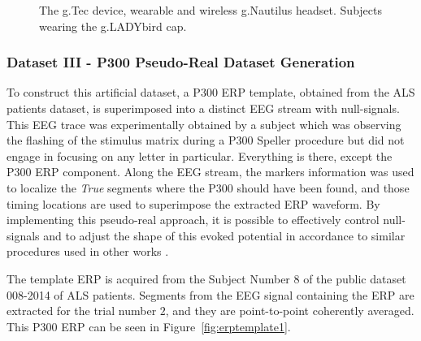 \begin{figure}[H]
\caption[g.Tec Device]{The g.Tec device, wearable and wireless g.Nautilus headset. Subjects wearing the g.LADYbird cap. }
\label{fig:gtecdevice}
\end{figure}

\subsubsection{Dataset III - P300 Pseudo-Real Dataset Generation}

To construct this artificial dataset, a P300 ERP template, obtained from the ALS patients dataset, is superimposed into a distinct EEG stream with null-signals.  This EEG trace was experimentally obtained by a subject which was observing the flashing of the stimulus matrix during a P300 Speller procedure but did not engage in focusing on any letter in particular. Everything is there, except the P300 ERP component. Along the EEG stream, the markers information was used to localize the \textit{True} segments where the P300 should have been found, and those timing locations are used to superimpose the extracted ERP waveform.  By implementing this pseudo-real approach, it is possible to effectively control null-signals and to adjust the shape of this evoked potential in accordance to similar procedures used in other works \cite{Ouyang2017,Jaskowski2000,QuianQuiroga2003}.

The template ERP is acquired from the Subject Number $8$ of the public dataset 008-2014 of ALS patients.  Segments from the EEG signal containing the ERP are extracted for the trial number $2$, and they are point-to-point coherently averaged.  This P300 ERP can be seen in Figure~\ref{fig:erptemplate1}. 

